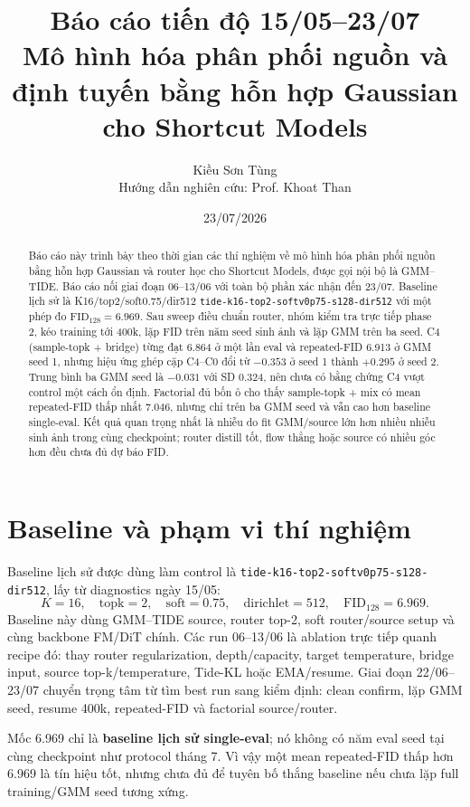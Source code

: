 \documentclass[11pt,a4paper]{article}
\title{\textbf{Báo cáo tiến độ 15/05--23/07}\\
\large Mô hình hóa phân phối nguồn và định tuyến bằng hỗn hợp Gaussian cho
Shortcut Models}
\author{Kiều Sơn Tùng\\\small Hướng dẫn nghiên cứu: Prof. Khoat Than}
\date{23/07/2026}
\newcommand{\fid}{\mathrm{FID}}
\newcommand{\run}[1]{{\small\nolinkurl{#1}}}
\begin{document}
\maketitle

\begin{abstract}
Báo cáo này trình bày theo thời gian các thí nghiệm về mô hình hóa phân phối
nguồn bằng hỗn hợp Gaussian và router học cho Shortcut Models, được gọi nội bộ
là GMM--TIDE. Báo cáo nối giai đoạn 06--13/06 với toàn bộ phần xác nhận đến
23/07. Baseline lịch sử là K16/top2/soft0.75/dir512
\run{tide-k16-top2-softv0p75-s128-dir512} với một phép đo
\(\fid_{128}=6.969\). Sau sweep điều chuẩn router, nhóm kiểm tra trực tiếp phase
2, kéo training tới 400k, lặp FID trên năm seed sinh ảnh và lặp GMM trên ba
seed. C4 (sample-topk + bridge) từng đạt 6.864 ở một lần eval và repeated-FID
6.913 ở GMM seed 1, nhưng hiệu ứng ghép cặp C4--C0 đổi từ \(-0.353\) ở seed 1
thành \(+0.295\) ở seed 2. Trung bình ba GMM seed là \(-0.031\) với SD 0.324,
nên chưa có bằng chứng C4 vượt control một cách ổn định. Factorial đủ bốn ô cho
thấy sample-topk + mix có mean repeated-FID thấp nhất \(7.046\), nhưng chỉ trên
ba GMM seed và vẫn cao hơn baseline single-eval. Kết quả quan trọng nhất là
nhiễu do fit GMM/source lớn hơn nhiều nhiễu sinh ảnh trong cùng checkpoint;
router distill tốt, flow thẳng hoặc source có nhiều góc hơn đều chưa đủ dự báo
FID.
\end{abstract}

\section{Baseline và phạm vi thí nghiệm}

Baseline lịch sử được dùng làm control là \run{tide-k16-top2-softv0p75-s128-dir512}, lấy từ diagnostics ngày 15/05:
\[
  K=16,\quad \mathrm{topk}=2,\quad \mathrm{soft}=0.75,\quad \mathrm{dirichlet}=512,\quad \fid_{128}=6.969.
\]
Baseline này dùng GMM--TIDE source, router top-2, soft router/source setup và cùng backbone FM/DiT chính. Các run 06--13/06 là ablation trực tiếp quanh recipe đó: thay router regularization, depth/capacity, target temperature, bridge input, source top-k/temperature, Tide-KL hoặc EMA/resume. Giai đoạn 22/06--23/07 chuyển trọng tâm từ tìm best run sang kiểm định: clean confirm, lặp GMM seed, resume 400k, repeated-FID và factorial source/router.

Mốc 6.969 chỉ là \textbf{baseline lịch sử single-eval}; nó không có năm eval seed tại cùng checkpoint như protocol tháng 7. Vì vậy một mean repeated-FID thấp hơn 6.969 là tín hiệu tốt, nhưng chưa đủ để tuyên bố thắng baseline nếu chưa lặp full training/GMM seed tương xứng.
\end{document}
